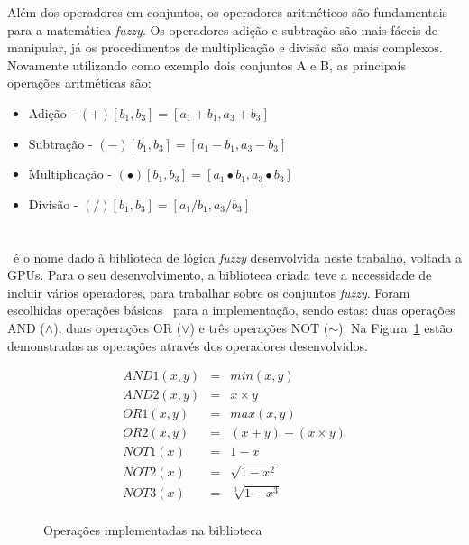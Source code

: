 \documentclass[12pt]{article}
\begin{document}
Além dos operadores em conjuntos, os operadores aritméticos são fundamentais para a matemática \textit{fuzzy}. Os operadores adição e subtração são mais fáceis de manipular, já os procedimentos de multiplicação e divisão são mais complexos. Novamente utilizando como exemplo dois conjuntos A e B, as principais operações aritméticas são:

\begin{itemize}
	\item Adição - 
\begin{math} [{a_1},{a_3}] (+) [{b_1},{b_3}]= [{a_1 + b_1,a_3 + b_3}]  \end{math}
	\item Subtração - \begin{math} [{a_1},{a_3}] (-) [{b_1},{b_3}] = [{a_1 - b_1,a_3 - b_3}]  \end{math}
	\item Multiplicação - 
\begin{math} [{a_1},{a_3}] (\bullet) [{b_1},{b_3}]= [{a_1 \bullet b_1,a_3 \bullet b_3}]  \end{math}
	\item Divisão - 
\begin{math} [{a_1},{a_3}] (/) [{b_1},{b_3}]= [{a_1 / b_1,a_3 / b_3}]  \end{math} 
\end{itemize}

\section{\libname}
\label{sec:lib}

	\libname~é o nome dado à biblioteca de lógica \textit{fuzzy} desenvolvida neste trabalho, voltada a GPUs. Para o seu desenvolvimento, a biblioteca criada teve a necessidade de incluir vários operadores, para trabalhar sobre os conjuntos \textit{fuzzy}. Foram escolhidas operações básicas~\cite{klir:95} para a implementação, sendo estas: duas operações AND ($\wedge$), duas operações OR ($\vee$) e três operações NOT ($\sim$). Na Figura~\ref{fig:fuzzyops} estão demonstradas as operações através dos operadores desenvolvidos.
	
\begin{figure}[!h]
\centering

\[ \begin{array}{ccc}
	AND1(x, y) & = & min(x, y) \\
	AND2(x, y) & = & x \times y \\
	OR1(x, y) & = & max(x, y) \\
	OR2(x, y) & = & (x + y) - (x \times y)\\
	NOT1(x) & = & 1 - x \\
	NOT2(x) & = & \sqrt{1-x^2} \\
	NOT3(x) & = & \sqrt[3]{1-x^3} \\
\end{array} \]
\caption{Operações implementadas na biblioteca~\libname}
\label{fig:fuzzyops}
\end{figure}
\end{document}
